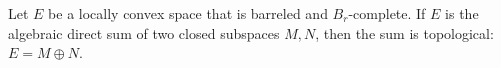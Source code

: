 Let $E$ be a locally convex space that is barreled and $B_r$-complete. If $E$ is the algebraic direct sum of two closed subspaces $M, N$, then the sum is topological: $E = M \oplus N$.